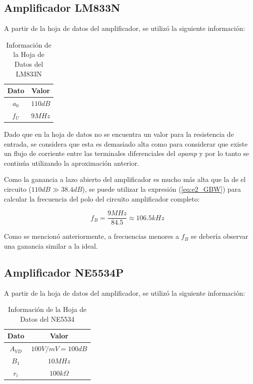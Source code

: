 \subsection{Amplificador LM833N}
A partir de la hoja de datos del amplificador, se utilizó la siguiente información:
 
\begin{table}[ht]
\begin{center}
\begin{tabular}{||c|c||}
\hline
	Dato	&	Valor		\\
	\hline
	$a_0$	&	$110 dB$	\\
	$f_U$	&	$9 MHz$		\\
\hline
\end{tabular}
\end{center}
\caption{Información de la Hoja de Datos del LM833N}
\label{tab:e2_info_lm}
\end{table}

Dado que en la hoja de datos no se encuentra un valor para la resistencia de entrada, se considera que esta es demasiado alta como para considerar que existe un flujo de corriente entre las terminales diferenciales del \textit{opamp} y por lo tanto se continúa utilizando la aproximación anterior.

Como la ganancia a lazo abierto del amplificador es mucho más alta que la de el circuito ($110 dB \gg 38.4 dB$), se puede utilizar la expresión (\ref{eq:e2_GBW}) para calcular la frecuencia del polo del circuito amplificador completo:

\begin{equation}
f_B= \frac{9 MHz}{84.5} \approx 106.5 kHz
\label{val:e2_fB_lm}
\end{equation}

Como se mencionó anteriormente, a frecuencias menores a $f_B$ se debería observar una ganancia similar a la ideal.

\newpage

\subsection{Amplificador NE5534P}
A partir de la hoja de datos del amplificador, se utilizó la siguiente información:

\begin{table}[ht]
\begin{center}
\begin{tabular}{||c|c||}
\hline
	Dato	&	Valor		\\
	\hline
	$A_{VD}$	&	$100 V/mV = 100 dB$	\\
	$B_1$	&	$10 MHz$		\\
	$r_i$	&	$100 k\Omega$	\\
\hline
\end{tabular}
\end{center}
\caption{Información de la Hoja de Datos del NE5534}
\label{tab:e2_info_ne}
\end{table}

